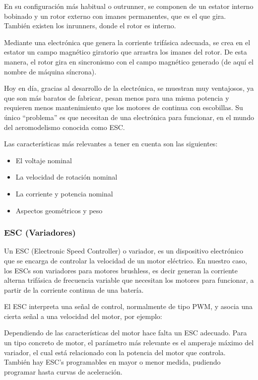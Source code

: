 \documentclass[12pt,twoside]{article}
\begin{document}
\begin{itemize}
	En su configuración más habitual o outrunner, se componen de un estator interno 	bobinado y un rotor externo con imanes permanentes, que es el que gira. También 	existen los inrunners, donde el rotor es interno.
	
Mediante una electrónica que genera la corriente trifásica adecuada, se crea en el 	estator un campo magnético giratorio que arrastra los imanes del rotor. De esta 	manera, el rotor gira en sincronismo con el campo magnético generado (de aquí el 	nombre de máquina síncrona).

	Hoy en día, gracias al desarrollo de la electrónica, se muestran muy ventajosos, ya que 	son más baratos de fabricar, pesan menos para una misma potencia y requieren 	menos mantenimiento que los 	motores de continua con escobillas. Su único 	“problema” es que necesitan de una electrónica para funcionar, en el mundo del 	aeromodelismo conocida como ESC.
	
	Las características más relevantes a tener en cuenta son las siguientes:
		\begin{itemize}

			\item El voltaje nominal
			\item La velocidad de rotación nominal
			\item La corriente y potencia nominal
			\item Aspectos geométricos y peso
		\end{itemize}
	

		\end{itemize}
		
			\subsubsection{ESC (Variadores)}\label{subsubsec:ESC}
			
			Un ESC (Electronic Speed Controller) o variador, es un dispositivo electrónico que se encarga de controlar la velocidad de un motor eléctrico. En nuestro caso, los ESCs son variadores para motores brushless, es decir generan la corriente alterna trifásica de frecuencia variable que necesitan los motores para funcionar, a partir de la corriente continua de una batería.
			
El ESC interpreta una señal de control, normalmente de tipo PWM, y asocia una cierta señal a una velocidad del motor, por ejemplo: 

Dependiendo de las características del motor hace falta un ESC adecuado. Para un tipo concreto de motor, el parámetro más relevante es el amperaje máximo del variador, el cual está relacionado con la potencia del motor que controla. También hay ESC’s programables en mayor o menor medida, pudiendo programar hasta curvas de aceleración.
\end{document}
